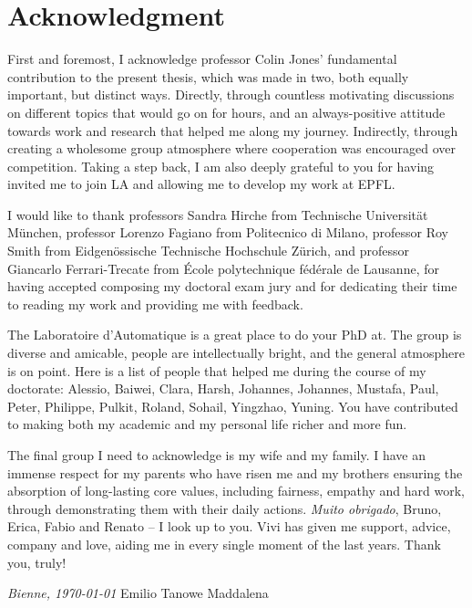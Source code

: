 \chapter*{Acknowledgment}


First and foremost, I acknowledge professor Colin Jones' fundamental contribution to the present thesis, which was made in two, both equally important, but distinct ways. Directly, through countless motivating discussions on different topics that would go on for hours, and an always-positive attitude towards work and research that helped me along my journey. Indirectly, through creating a wholesome group atmosphere where cooperation was encouraged over competition. Taking a step back, I am also deeply grateful to you for having invited me to join LA and allowing me to develop my work at EPFL. 

I would like to thank professors Sandra Hirche from Technische Universität München, professor Lorenzo Fagiano from Politecnico di Milano, professor Roy Smith from Eidgenössische Technische Hochschule Zürich, and professor Giancarlo Ferrari-Trecate from École polytechnique fédérale de Lausanne, for having accepted composing my doctoral exam jury and for dedicating their time to reading my work and providing me with feedback.

The Laboratoire d'Automatique is a great place to do your PhD at. The group is diverse and amicable, people are intellectually bright, and the general atmosphere is on point. Here is a list of people that helped me during the course of my doctorate: Alessio, Baiwei, Clara, Harsh, Johannes, Johannes, Mustafa, Paul, Peter, Philippe, Pulkit, Roland, Sohail, Yingzhao, Yuning. You have contributed to making both my academic and my personal life richer and more fun.

The final group I need to acknowledge is my wife and my family. I have an immense respect for my parents who have risen me and my brothers ensuring the absorption of long-lasting core values, including fairness, empathy and hard work, through demonstrating them with their daily actions. \textit{Muito obrigado}, Bruno, Erica, Fabio and Renato -- I look up to you. Vivi has given me support, advice, company and love, aiding me in every single moment of the last years. Thank you, truly! 

\bigskip
 
\noindent\textit{Bienne, \today}
\hfill Emilio Tanowe Maddalena
